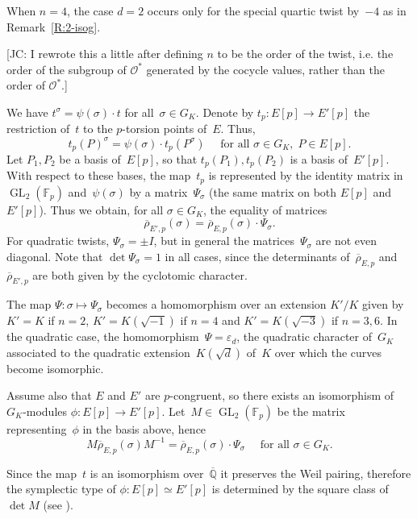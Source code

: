 \documentclass[12pt, reqno]{amsart}
\newcommand{\F}{\mathbb{F}}
\newcommand{\Q}{\mathbb{Q}}
\newcommand{\Qbar}{{\overline{\Q}}}
\newcommand{\rhobar}{{\overline{\rho}}}
\newcommand{\calO}{\mathcal{O}}
\newcommand{\GL}{\operatorname{GL}}
\numberwithin{equation}{section}
\theoremstyle{definition}
\theoremstyle{remark}
\newcommand{\jc}[1]{{\color{darkgreen} \textsf{[JC: #1]}}}
\begin{document}
When $n=4$, the case $d=2$ occurs only for the special
quartic twist by~$-4$ as in Remark~\ref{R:2-isog}.

\jc{I rewrote this a little after defining $n$ to be the order of the
  twist, i.e. the order of the subgroup of $\calO^*$ generated by the
  cocycle values, rather than the order of $\calO^*$.}

We have $t^\sigma = \psi(\sigma) \cdot t$ for all~$\sigma \in G_K$. 
Denote by $t_p : E[p] \to E'[p]$ the restriction of~$t$ to the $p$-torsion points of~$E$. Thus,
\begin{equation}\label{E:cocycle}
   t_p(P)^\sigma = \psi(\sigma) \cdot t_p(P^\sigma) \quad \text{ for all } \sigma \in G_K,
  \; P \in E[p].
\end{equation}
Let $P_1, P_2$ be a basis of~$E[p]$, so that $t_p(P_1), t_p(P_2)$ is a
basis of~$E'[p]$.  With respect to these bases, the map~$t_p$ is
represented by the identity matrix in~$\GL_2(\F_p)$ and~$\psi(\sigma)$
by a matrix~$\Psi_\sigma$ (the same matrix on both $E[p]$
and~$E'[p]$).  Thus we obtain, for all $\sigma \in G_K$, the equality
of matrices
\begin{equation} \label{E:PsiMatrix}
 \rhobar_{E',p}(\sigma) = \rhobar_{E,p}(\sigma) \cdot \Psi_\sigma. 
\end{equation}
For quadratic twists, $\Psi_\sigma=\pm I$, but in general the
matrices~$\Psi_\sigma$ are not even diagonal.  Note that
$\det\Psi_\sigma=1$ in all cases, since the determinants
of~$\rhobar_{E,p}$ and~$\rhobar_{E',p}$ are both given by the
cyclotomic character.

The map $\Psi : \sigma \mapsto \Psi_\sigma$ becomes a homomorphism
over an extension $K'/K$ given by $K'=K$ if $n=2$, $K'=K(\sqrt{-1})$
if $n=4$ and $K'=K(\sqrt{-3})$ if $n=3,6$. In the quadratic case, the
homomorphism~$\Psi=\varepsilon_d$, the quadratic character of~$G_K$
associated to the quadratic extension~$K(\sqrt{d})$ of~$K$ over which
the curves become isomorphic.

Assume also that $E$ and $E'$ are $p$-congruent, so there exists an 
isomorphism of $G_K$-modules $\phi : E[p] \to E'[p]$. Let~$M \in \GL_2(\F_p)$ be the matrix representing~$\phi$ in the basis above, hence
\begin{equation}\label{E:PsiM}
M \rhobar_{E,p}(\sigma) M^{-1} = \rhobar_{E,p}(\sigma) \cdot \Psi_\sigma 
 \quad \text{ for all } \sigma \in G_K.
\end{equation}

Since the map~$t$ is an isomorphism over~$\Qbar$ it preserves the Weil
pairing, therefore the symplectic 
type of $\phi : E[p] \simeq
E'[p]$ is determined by the square class of $\det M$ (see \cite[Lemma~6]{FKSym}).
\end{document}
